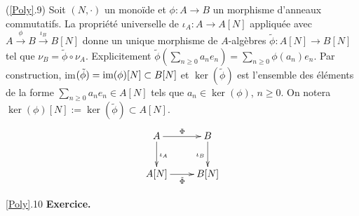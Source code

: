 \documentclass[a4paper, oneside, 12pt]{book}
\theoremstyle{definition} %
\begin{document}
 
 
 
 

 
  (\ref{Poly}.9)  Soit $(N,\cdot)$ un monoïde et $\phi: A\rightarrow B$ un morphisme d'anneaux commutatifs. La propriété universelle de $\iota_A:A\rightarrow A[N]$ appliquée avec $A\stackrel{\phi}{\rightarrow} B\stackrel{\iota_B}{\rightarrow} B[N]$ donne un unique morphisme de $A$-algèbres $\tilde{\phi}:A[N]\rightarrow B[N]$ tel que $\nu_B=\tilde{\phi}\circ \nu_A$. Explicitement $\tilde{\phi}(\sum_{n\geq 0}a_ne_n)=\sum_{n\geq 0}\phi(a_n)e_n$.  Par construction, im$(\tilde{\phi})=\hbox{\rm im}(\phi)[N]\subset B[N]$ et $\ker(\tilde{\phi})$ est l'ensemble des éléments de la forme $\sum_{n\geq 0}a_ne_n\in A[N]$ tels que $a_n\in \ker(\phi)$, $n\geq 0$. On notera $\ker(\phi)[N]:=\ker(\tilde{\phi})\subset A[N]$.\\

	$$ \xymatrix{ A\ar[r]^\Phi \ar[d]^{\iota_A} & B \ar[d]_{\iota_B} \\ A[N]\ar[r]_{\tilde{\Phi} } & B[N] } $$
 
 \ref{Poly}.10 \textbf{Exercice.} \\
 
\end{document}
